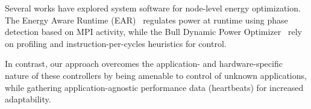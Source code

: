 Several works have explored system software for node-level energy optimization. The Energy Aware Runtime (EAR)~\cite{corbalan2019ear} regulates power at runtime using phase detection based on MPI activity, while the Bull Dynamic Power Optimizer~\cite{8514915} rely on profiling and instruction-per-cycles heuristics for control.

In contrast, our approach overcomes the application- and hardware-specific nature of these controllers by being amenable to control of unknown applications, while gathering application-agnostic performance data (heartbeats) for increased adaptability.



